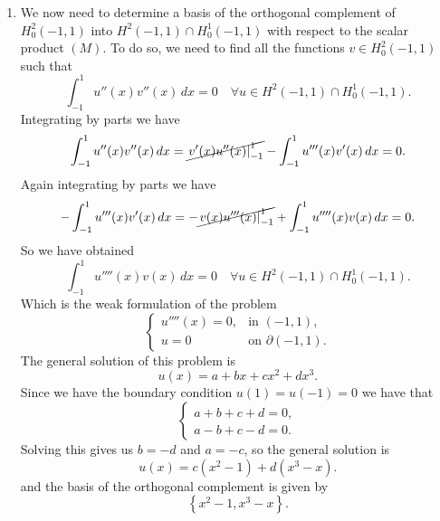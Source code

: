 \begin{enumerate}
    \item We now need to determine a basis of the orthogonal complement of \(H^2_0(-1,
          1)\) into \(H^2(-1, 1)\cap H^1_0(-1, 1)\) with respect to the scalar product
          \((M)\). To do so, we need to find all the functions \(v \in H^2_0(-1, 1)\)
          such that
          \[
              \int_{-1}^1 u''(x) v''(x) \, dx = 0 \quad \forall u \in H^2(-1, 1)\cap H^1_0(-1, 1).
          \]
          Integrating by parts we have
          \[
              \int_{-1}^1 u''(x) v''(x) \, dx = \cancel{\left. v'(x) u''(x) \right|_{-1}^1} - \int_{-1}^1 u'''(x) v'(x) \, dx = 0.
          \]
          Again integrating by parts we have
          \[
              -\int_{-1}^1 u'''(x) v'(x) \, dx = -\cancel{\left. v(x) u'''(x) \right|_{-1}^1} + \int_{-1}^1 u''''(x) v(x) \, dx = 0.
          \]
          So we have obtained
          \[
              \int_{-1}^1 u''''(x) v(x) \, dx = 0 \quad \forall u \in H^2(-1, 1)\cap H^1_0(-1, 1).
          \]
          Which is the weak formulation of the problem
          \[
              \begin{cases}
                  u''''(x) = 0, & \text{in } (-1, 1),          \\
                  u = 0         & \text{on } \partial (-1, 1).
              \end{cases}
          \]
          The general solution of this problem is
          \[
              u(x) = a + bx + cx^2 + d x^3.
          \]
          Since we have the boundary condition \(u(1) = u(-1) = 0\) we have that
          \[
              \begin{cases}
                  a + b + c + d = 0, \\
                  a - b + c - d = 0.
              \end{cases}
          \]
          Solving this gives us \(b = -d\) and \(a = -c\), so the general solution is
          \[
              u(x) = c(x^2 - 1) + d(x^3 - x).
          \]
          and the basis of the orthogonal complement is given by
          \[
              \left\{ x^2 - 1, x^3 - x \right\}.
          \]
\end{enumerate}

